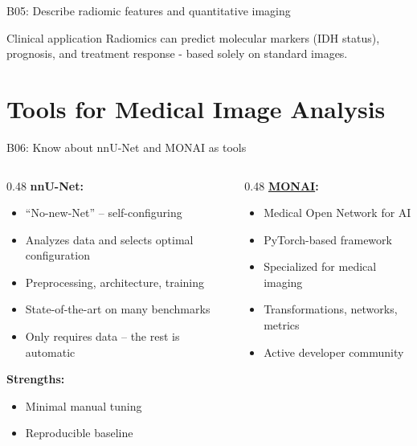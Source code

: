 \documentclass[aspectratio=169, 10pt]{beamer}
\begin{document}
\begin{frame}{B05: Describe radiomic features and quantitative imaging}
    \vspace{0.3cm}
    \begin{block}{Clinical application}
        Radiomics can predict molecular markers (IDH status), prognosis, and treatment response - based solely on standard images.
    \end{block}
\end{frame}

\section{Tools for Medical Image Analysis}

\begin{frame}{B06: Know about nnU-Net and MONAI as tools}
    \begin{columns}[T]
        \begin{column}{0.48\textwidth}
            \textbf{nnU-Net:}
            \begin{itemize}
                \item ``No-new-Net'' -- self-configuring
                \item Analyzes data and selects optimal configuration
                \item Preprocessing, architecture, training
                \item State-of-the-art on many benchmarks
                \item Only requires data -- the rest is automatic
            \end{itemize}
            
            \vspace{0.3cm}
            \textbf{Strengths:}
            \begin{itemize}
                \item Minimal manual tuning
                \item Reproducible baseline
            \end{itemize}
        \end{column}
        \begin{column}{0.48\textwidth}
            \textbf{\href{https://monai.io/}{MONAI}:}
            \begin{itemize}
                \item Medical Open Network for AI
                \item PyTorch-based framework
                \item Specialized for medical imaging
                \item Transformations, networks, metrics
                \item Active developer community
            \end{itemize}
            

\end{column}
\end{columns}
\end{frame}
\end{document}
